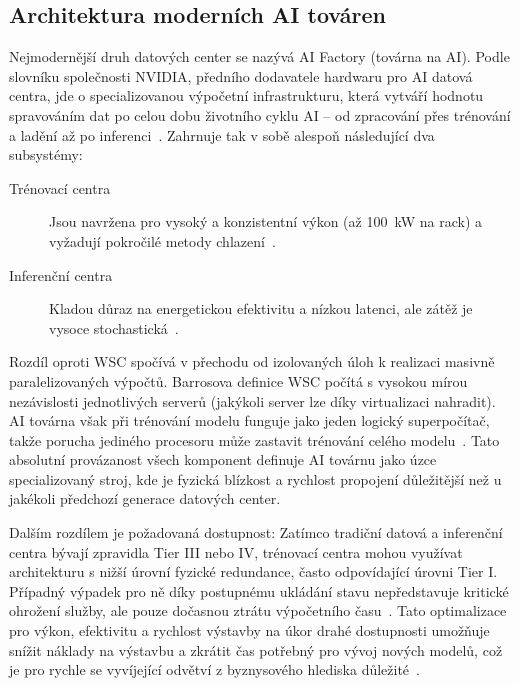 \subsection{Architektura moderních AI továren}
\label{subsec:ai_factory}

Nejmodernější druh datových center se nazývá AI Factory (továrna na AI). Podle slovníku společnosti NVIDIA, předního dodavatele hardwaru pro AI datová centra, jde o specializovanou výpočetní infrastrukturu, která vytváří hodnotu spravováním dat po celou dobu životního cyklu AI -- od zpracování přes trénování a ladění až po inferenci~\cite{noauthor_nvidia_nodate}. Zahrnuje tak v sobě alespoň následující dva subsystémy:

\begin{description}
    \item[Trénovací centra] Jsou navržena pro vysoký a konzistentní výkon (až 100~kW na rack) a vyžadují pokročilé metody chlazení~\cite{cruzes_data_2025}.

    \item[Inferenční centra] Kladou důraz na energetickou efektivitu a nízkou latenci, ale zátěž je vysoce stochastická~\cite{cruzes_data_2025, ginzburg-ganz_technical_2025}.
\end{description}

Rozdíl oproti WSC spočívá v přechodu od izolovaných úloh k realizaci masivně paralelizovaných výpočtů. Barrosova definice WSC počítá s vysokou mírou nezávislosti jednotlivých serverů (jakýkoli server lze díky virtualizaci nahradit). AI továrna však při trénování modelu funguje jako jeden logický superpočítač, takže porucha jediného procesoru může zastavit trénování celého modelu~\cite[s. 270]{barroso_data_2026}. Tato absolutní provázanost všech komponent definuje AI továrnu jako úzce specializovaný stroj, kde je fyzická blízkost a rychlost propojení důležitější než u jakékoli předchozí generace datových center.

Dalším rozdílem je požadovaná dostupnost: Zatímco tradiční datová a inferenční centra bývají zpravidla Tier III nebo IV, trénovací centra mohou využívat architekturu s nižší úrovní fyzické redundance, často odpovídající úrovni Tier I. Případný výpadek pro ně díky postupnému ukládání stavu nepředstavuje kritické ohrožení služby, ale pouze dočasnou ztrátu výpočetního času~\cite[s. 83]{barroso_data_2026}. Tato optimalizace pro výkon, efektivitu a rychlost výstavby na úkor drahé dostupnosti umožňuje snížit náklady na výstavbu a zkrátit čas potřebný pro vývoj nových modelů, což je pro rychle se vyvíjející odvětví z byznysového hlediska důležité~\cite[s. 24]{ginzburg-ganz_technical_2025}.


